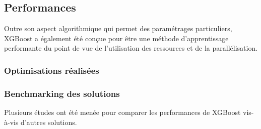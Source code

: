 \subsection{Performances}
\label{sec:perf}
Outre son aspect algorithmique qui permet des paramétrages particuliers, XGBoost a également été conçue pour être une méthode d'apprentissage performante du point de vue de l'utilisation des ressources et de la parallélisation.
\subsubsection{Optimisations réalisées}
\subsubsection{Benchmarking des solutions}
Plusieurs études ont été menée pour comparer les performances de XGBoost vis-à-vis d'autres solutions.
